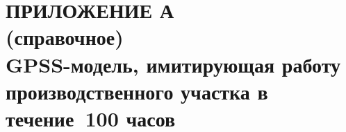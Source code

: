 \renewcommand{\thefigure}{\Asbuk{section}.\arabic{figure}}
\renewcommand{\thetable}{\Asbuk{section}.\arabic{table}}
\renewcommand{\thelstlisting}{\Asbuk{section}.\arabic{lstlisting}}

\pagestyle{fancy}
\fancyhf{} %
\fancyfoot[R]{\thepage}
\renewcommand{\headrulewidth}{0pt}
\renewcommand{\footrulewidth}{0pt}

\setlength{\headheight}{10mm}
\setlength{\headsep}{\baselineskip}

\section*{ПРИЛОЖЕНИЕ А\\(справочное)\\GPSS-модель, имитирующая работу \\
  производственного участка в течение~100 часов}

\thispagestyle{plain}
\setcounter{section}{1}
\setcounter{figure}{0}
\setcounter{table}{0}
\setcounter{lstlisting}{0}


